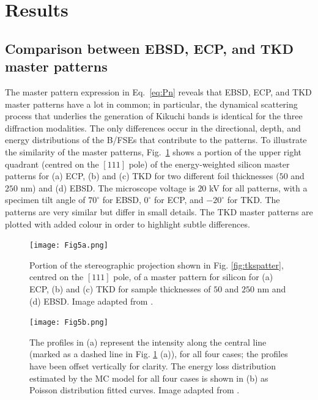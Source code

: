 \section{Results}
\subsection{Comparison between EBSD, ECP, and TKD master patterns}
\label{sec:comparison}
The master pattern expression in Eq.~\ref{eq:Pn} reveals that EBSD, ECP, and TKD master patterns have a lot in common; in particular, the dynamical scattering process that underlies the generation of Kikuchi bands is identical for the three diffraction modalities. The only differences occur in the directional, depth, and energy distributions of the B/FSEs that contribute to the patterns.  To illustrate the similarity of the master patterns, Fig.~\ref{fig:MPs} shows a portion of the upper right quadrant (centred on the $[111]$ pole) of the energy-weighted silicon master patterns for (a) ECP, (b) and (c) TKD for two different foil thicknesses ($50$ and $250$ nm) and (d) EBSD. The  microscope voltage is $20$ kV for all patterns, with a specimen tilt angle of $70^{\circ}$ for EBSD, $0^{\circ}$ for ECP, and $-20^{\circ}$ for TKD.  The patterns are very similar but differ in small details. The TKD master patterns are plotted with added colour in order to highlight  subtle differences.

\begin{figure}[ht]
\centering
\texttt{[image: Fig5a.png]}%
\caption[Master patterns for ECP, TKD and EBSD]{Portion of the stereographic projection shown in Fig. \ref{fig:tkspatter}, centred on the $[111]$ pole, of a master pattern for silicon for (a) ECP, (b) and  (c) TKD for sample thicknesses of $50$ and $250$ nm and (d) EBSD.  Image adapted from \cite{PascalTKD}. }
\label{fig:MPs}
\end{figure}


\begin{figure}[ht]
\centering
\texttt{[image: Fig5b.png]}
\caption[Line scans for previous maps and energy distributions]{The profiles in (a) represent the intensity along the central line (marked as a dashed line in Fig. \ref{fig:MPs} (a)), for all four cases; the profiles have been offset vertically for clarity. The energy loss distribution estimated by the MC model for all four cases is shown in (b) as Poisson distribution fitted curves.  Image adapted from \cite{PascalTKD}.}
\label{fig:MPs_lines}
\end{figure}

